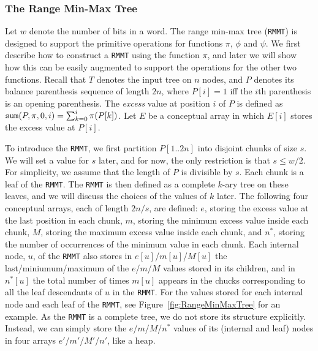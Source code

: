 \subsubsection{The Range Min-Max Tree}

Let $w$ denote the number of bits in a word. The range min-max tree ({\tt RMMT}) is designed to support the primitive operations for functions $\pi$, $\phi$ and $\psi$. %
We first describe how to construct a {\tt RMMT} using the function $\pi$, and later we will show how this can be easily augmented to support the operations for the other two functions. 
Recall that $T$ denotes the input tree on $n$ nodes, and $P$ denotes its balance parenthesis sequence of length $2n$, where $P[i] = 1$ iff the $i$th parenthesis is an opening parenthesis. 
The {\em excess} value at position $i$ of $P$ is defined as $\mathtt{sum}(P,\pi,0,i) = \sum_{k=0}^{i} \pi(P[k])$. 
Let $E$ be a conceptual array in which $E[i]$ stores the excess value at $P[i]$. 

To introduce the {\tt RMMT}, we first partition $P[1..2n]$ into disjoint chunks of size $s$. We will set a value for $s$ later, and for now, the only restriction is that $s \le w/2$. 
For simplicity, we assume that the length of $P$ is divisible by $s$. 
Each chunk is a leaf of the {\tt RMMT}. The {\tt RMMT} is then defined as a complete $k$-ary tree on these leaves, and we will discuss the choices of the values of $k$ later. %
The following four conceptual arrays, each of length $2n / s$, are defined: $e$, storing the excess value at the last position in each chunk, $m$, storing the minimum excess value inside
each chunk, $M$, storing the maximum excess value inside each
chunk, and $n^*$, storing the number of occurrences of the minimum
value in each chunk. 
Each internal node, $u$, of the {\tt RMMT} also stores in $e[u]$/$m[u]$/$M[u]$ the last/miniumum/maximum of the $e$/$m$/$M$ values stored in its children, and in $n^*[u]$ the total number of times $m[u]$ appears in the chucks corresponding to all the leaf descendants of $u$ in the {\tt RMMT}. 
For the values stored for each internal node and each leaf of the {\tt RMMT}, see Figure~\ref{fig:RangeMinMaxTree} for an example. 
As the {\tt RMMT} is a complete tree, we do not store its structure explicitly. 
Instead, we can simply store the $e$/$m$/$M$/$n^*$ values of its (internal and leaf) nodes in four arrays $e'$/$m'$/$M'$/$n'$, like a heap. 

